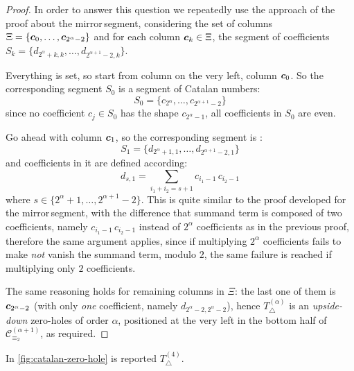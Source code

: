 \begin{proof}
In order to answer this question we repeatedly use the approach
of the proof about the \flqq mirror\frqq\,segment, considering the set of columns 
$\Xi=\lbrace \boldsymbol{c}_{0},\ldots, \boldsymbol{c}_{2^{{\alpha}}-2}\rbrace$ and
for each column $\boldsymbol{c}_{k}\in\Xi$, the segment of coefficients
    $S_{k}=\lbrace d_{2^{{\alpha}}+k,k},\ldots,d_{2^{{\alpha}+1}-2,k} \rbrace$.

Everything is set, so start from column on the very left, column $\boldsymbol{c}_{0}$.
So the corresponding segment $S_{0}$ is
a segment of Catalan numbers:
\begin{displaymath}
 S_{0}=\lbrace c_{2^{{\alpha}}}, \ldots, c_{2^{{\alpha}+1}-2}\rbrace
\end{displaymath}
since no coefficient $c_{j}\in S_{0}$ has the shape $c_{2^{\alpha}-1}$, 
all coefficients in $S_{0}$ are even.

Go ahead with column $\boldsymbol{c}_{1}$, so the corresponding segment is :
\begin{displaymath}
    S_{1}=\lbrace d_{2^{{\alpha}}+1,1},\ldots,d_{2^{{\alpha}+1}-2,1} \rbrace
\end{displaymath}
and coefficients in it are defined according:
\begin{displaymath}
    d_{s, 1} = \sum_{i_{1}+i_{2}=s+1} {c_{i_{1}-1}\,c_{i_{2}-1}}
\end{displaymath}
where $s\in \lbrace2^{{\alpha}}+1,\ldots,2^{{\alpha}+1}-2\rbrace$. 
This is quite similar to the proof developed for the \flqq mirror\frqq\,segment,
with the difference that summand term is composed of two coefficients, namely
$c_{i_{1}-1}\,c_{i_{2}-1}$ instead of $2^{{\alpha}}$ coefficients as in the previous proof, 
therefore the same argument applies,
since if multiplying $2^{{\alpha}}$ coefficients fails to make \emph{not} vanish
the summand term, modulo $2$, the same failure is reached if multiplying only $2$ coefficients.

The same reasoning holds for remaining columns in $\Xi$: the last one of them is 
$\boldsymbol{c}_{2^{\alpha}-2}$ (with only \emph{one} coefficient, namely $d_{2^{\alpha}-2,2^{\alpha}-2}$), 
hence $T_{\bigtriangleup}^{({\alpha})}$ is an \emph{upside-down} zero-holes of order $\alpha$,
positioned at the very left in the bottom half of $\mathcal{C}_{\equiv_{2}}^{(\alpha+1)}$, as required.

\end{proof}


In \autoref{fig:catalan-zero-hole} is reported $T_{\bigtriangleup}^{(4)}$.


